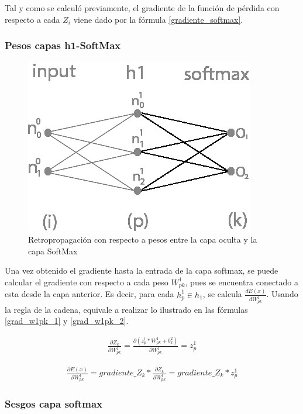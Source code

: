Tal y como se calculó previamente, el gradiente de la función de pérdida con respecto a cada $Z_i$ viene dado por la fórmula \ref{gradiente_softmax}.


\subsubsection{Pesos capas h1-SoftMax}

\begin{figure}[H]
	\centering
	\includegraphics[scale=0.35]{imagenes/nn_1_capa_pesos_h1_output.jpg}  
	\caption{Retropropagación con respecto a pesos entre la capa oculta y la capa SoftMax}
	\label{fig:nn_1_pesos_h1_output}
\end{figure}

Una vez obtenido el gradiente hasta la entrada de la capa softmax, se puede calcular el gradiente con respecto a cada peso $W^1_{pk}$, pues se encuentra conectado a esta desde la capa anterior. Es decir, para cada $h^1_p\in h_1$, se calcula $\frac{dE(x)}{dW^1_{pk}}$. Usando la regla de la cadena, equivale a realizar lo ilustrado en las fórmulas \ref{grad_w1pk_1} y \ref{grad_w1pk_2}.

\begin{gather}
	\frac{\partial Z_k}{\partial W^1_{pk}} = \frac{\partial (z^1_p * W^1 _{pk}+ b^2_k)}{\partial W^1_{pk }} = z^1_p
	\label{grad_w1pk_1}
\end{gather}

\begin{gather}
	\frac{\partial E(x)}{\partial W^1_{pk }} =  gradiente\_Z_k * \frac{\partial Z_k}{\partial W^1_{pk }} = gradiente\_Z_k * z^1_p
	\label{grad_w1pk_2}
\end{gather}

\subsubsection{Sesgos capa softmax}

